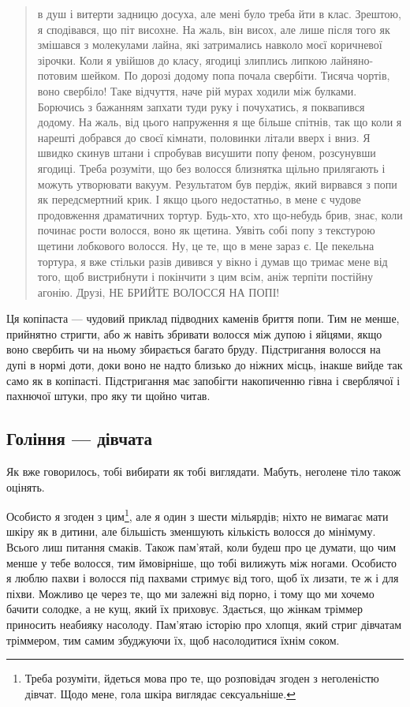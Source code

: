 \begin{quote}
в душ і витерти задницю досуха, але мені було треба йти в клас. Зрештою, я
сподівався, що піт висохне. На жаль, він висох, але лише після того як змішався
з молекулами лайна, які затримались навколо моєї коричневої зірочки. Коли я
увійшов до класу, ягодиці злиплись липкою лайняно-потовим шейком. По дорозі
додому попа почала свербіти. Тисяча чортів, воно свербіло! Таке відчуття, наче
рій мурах ходили між булками. Борючись з бажанням запхати туди руку і
почухатись, я поквапився додому. На жаль, від цього напруження я ще більше
спітнів, так що коли я нарешті добрався до своєї кімнати, половинки літали
вверх і вниз. Я швидко скинув штани і спробував висушити попу феном, розсунувши
ягодиці. Треба розуміти, що без волосся близнятка щільно прилягають і можуть
утворювати вакуум. Результатом був пердіж, який вирвався з попи як
передсмертний крик. І якщо цього недостатньо, в мене є чудове продовження
драматичних тортур. Будь-хто, хто що-небудь брив, знає, коли починає рости
волосся, воно як щетина. Уявіть собі попу з текстурою щетини лобкового волосся.
Ну, це те, що в мене зараз є. Це пекельна тортура, я вже стільки разів дивився
у вікно і думав що тримає мене від того, щоб вистрибнути і покінчити з цим
всім, аніж терпіти постійну агонію. Друзі, НЕ БРИЙТЕ ВОЛОССЯ НА ПОПІ!
\end{quote}

Ця копіпаста — чудовий приклад підводних каменів бриття попи. Тим не менше,
прийнятно стригти, або ж навіть збривати волосся між дупою і яйцями, якщо
воно свербить чи на ньому збирається багато бруду. Підстригання волосся на
дупі в нормі доти, доки воно не надто близько до ніжних місць, інакше вийде
так само як в копіпасті. Підстригання має запобігти накопиченню гівна і
сверблячої і пахнючої штуки, про яку ти щойно читав.

\subsection{Гоління — дівчата}
Як вже говорилось, тобі вибирати як тобі виглядати. Мабуть, неголене тіло
також оцінять.

Особисто я згоден з цим\footnote{Треба розуміти, йдеться мова про те, що
розповідач згоден з неголеністю дівчат. Щодо мене, гола шкіра виглядає
сексуальніше.}, але я один з шести мільярдів; ніхто не вимагає мати шкіру як
в дитини, але більшість зменшують кількість волосся до мінімуму. Всього лиш
питання смаків. Також пам’ятай, коли будеш про це думати, що чим менше у тебе
волосся, тим ймовірніше, що тобі вилижуть між ногами. Особисто я люблю пахви
і волосся під пахвами стримує від того, щоб їх лизати, те ж і для піхви.
Можливо це через те, що ми залежні від порно, і тому що ми хочемо бачити
солодке, а не кущ, який їх приховує. Здається, що жінкам тріммер приносить
неабияку насолоду. Пам’ятаю історію про хлопця, який стриг дівчатам тріммером,
тим самим збуджуючи їх, щоб насолодитися їхнім соком.


